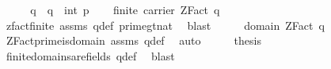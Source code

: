 \begin{isabellebody}
%
\isadelimproof
%
\endisadelimproof
%
\isatagproof
{}\isamarkupfalse%
\ {\isacharminus}{\kern0pt}\isanewline
\ \ \isamarkupfalse%
\ q\ \ {\isachardoublequoteopen}q\ {\isacharequal}{\kern0pt}\ int\ p{\isachardoublequoteclose}\isanewline
\ \ \isamarkupfalse%
\ {\isachardoublequoteopen}finite\ {\isacharparenleft}{\kern0pt}carrier\ {\isacharparenleft}{\kern0pt}ZFact\ q{\isacharparenright}{\kern0pt}{\isacharparenright}{\kern0pt}{\isachardoublequoteclose}\ \isamarkupfalse%
\ zfact{\isacharunderscore}{\kern0pt}finite\ assms\ q{\isacharunderscore}{\kern0pt}def\ prime{\isacharunderscore}{\kern0pt}gt{\isacharunderscore}{\kern0pt}{}{\isacharunderscore}{\kern0pt}nat\ \isamarkupfalse%
\ blast\isanewline
\ \ \isamarkupfalse%
\ \isamarkupfalse%
\ {\isachardoublequoteopen}domain\ {\isacharparenleft}{\kern0pt}ZFact\ q{\isacharparenright}{\kern0pt}{\isachardoublequoteclose}\ \isamarkupfalse%
\ ZFact{\isacharunderscore}{\kern0pt}prime{\isacharunderscore}{\kern0pt}is{\isacharunderscore}{\kern0pt}domain\ assms\ q{\isacharunderscore}{\kern0pt}def\ \isamarkupfalse%
\ auto\isanewline
\ \ \isamarkupfalse%
\ \isamarkupfalse%
\ {\isacharquery}{\kern0pt}thesis\ \isamarkupfalse%
\ finite{\isacharunderscore}{\kern0pt}domains{\isacharunderscore}{\kern0pt}are{\isacharunderscore}{\kern0pt}fields\ q{\isacharunderscore}{\kern0pt}def\ \isamarkupfalse%
\ blast\isanewline
{}\isamarkupfalse%
%
\endisatagproof
{\isafoldproof}%
%
\isadelimproof
\isanewline
%
\endisadelimproof
%
\isadelimtheory
\isanewline
%
\endisadelimtheory
%
\isatagtheory
{}\isamarkupfalse%
%
\endisatagtheory
{\isafoldtheory}%
%
\isadelimtheory
%
\endisadelimtheory
%
\end{isabellebody}%
\endinput
